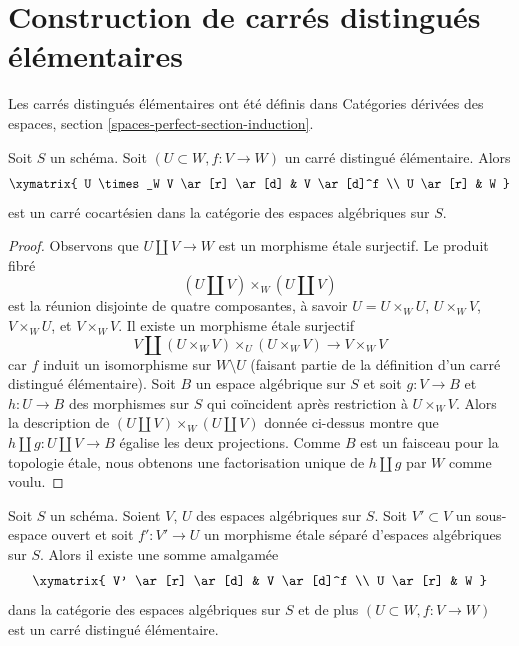 \section{Construction de carrés distingués élémentaires}
\label{section-elementary-dsitnguished-squares}

\noindent
Les carrés distingués élémentaires ont été définis dans
Catégories dérivées des espaces, section \ref{spaces-perfect-section-induction}.

\begin{lemma}
\label{lemma-elementary-distinguished-square-pushout}
Soit $S$ un schéma. Soit $(U \subset W, f : V \to W)$ un carré distingué élémentaire. Alors
$$
\xymatrix{
U \times_W V \ar[r] \ar[d] &
V \ar[d]^f \\
U \ar[r] & W
}
$$
est un carré cocartésien dans la catégorie des espaces algébriques sur $S$.
\end{lemma}

\begin{proof}
Observons que $U \amalg V \to W$ est un morphisme \'etale surjectif.
Le produit fibré
$$
(U \amalg V) \times_W (U \amalg V)
$$
est la réunion disjointe de quatre composantes, à savoir
$U = U \times_W U$, $U \times_W V$, $V \times_W U$,
et $V \times_W V$.
Il existe un morphisme \'etale surjectif
$$
V \amalg (U \times_W V) \times_U (U \times_W V) \longrightarrow V \times_W V
$$
car $f$ induit un isomorphisme sur $W \setminus U$
(faisant partie de la définition d'un carré distingué élémentaire).
Soit $B$ un espace algébrique sur $S$ et soit
$g : V \to B$ et $h : U \to B$ des morphismes sur
$S$ qui coïncident après restriction à $U \times_W V$.
Alors la description de
$(U \amalg V) \times_W (U \amalg V)$ donnée ci-dessus
montre que $h \amalg g : U \amalg V \to B$
égalise les deux projections. Comme $B$ est un faisceau
pour la topologie \'etale, nous obtenons une factorisation unique
de $h \amalg g$ par $W$ comme voulu.
\end{proof}

\begin{lemma}
\label{lemma-construct-elementary-distinguished-square}
Soit $S$ un schéma. Soient $V$, $U$ des espaces algébriques sur $S$.
Soit $V' \subset V$ un sous-espace ouvert et soit $f' : V' \to U$ un
morphisme \'etale séparé d'espaces algébriques sur $S$.
Alors il existe une somme amalgamée
$$
\xymatrix{
V' \ar[r] \ar[d] &
V \ar[d]^f \\
U \ar[r] & W
}
$$
dans la catégorie des espaces algébriques sur $S$ et de plus
$(U \subset W, f : V \to W)$ est un carré distingué élémentaire.
\end{lemma}

